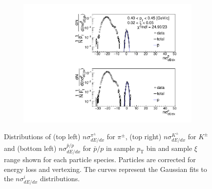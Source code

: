 \begin{figure}[h!]
\begin{subfigure}{.49\textwidth}
		\includegraphics[width=\linewidth, page=5]{chapters/chrgSTAR/img/dEdx/fit2019_thirdStep_2_0.pdf}
	\end{subfigure}
	\begin{minipage}{.49\textwidth}
		\caption{Distributions of (top left) $n\sigma^{\pi^\pm}_{dE/dx}$ for $\pi^\pm$, (top right) $n\sigma^{K^\pm}_{dE/dx}$ for $K^\pm$ and (bottom left) $n\sigma^{\bar{p}/p}_{dE/dx}$ for $\bar{p}/p$ in sample  $p_\textrm{T}$ bin and sample $\xi$ range  shown for each particle species. Particles are corrected for  energy loss and vertexing. The curves represent the Gaussian fits to the $n\sigma^{i}_{dE/dx}$ distributions.}
		\label{fig:dEdx_fit_example}
	\end{minipage}
	
\end{figure}


